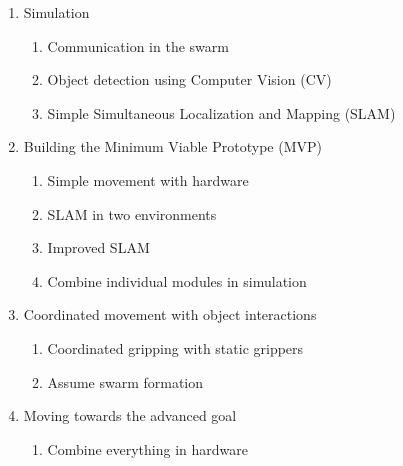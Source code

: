 \begin{enumerate}
    \item Simulation
    \begin{enumerate}[label=1.\arabic*]
        \item Communication in the swarm
        \item Object detection using Computer Vision (CV)
        \item Simple Simultaneous Localization and Mapping (SLAM)
    \end{enumerate}
    \item Building the Minimum Viable Prototype (MVP)
    \begin{enumerate}[label=2.\arabic*]
        \item Simple movement with hardware
        \item SLAM in two environments
        \item Improved SLAM
        \item Combine individual modules in simulation
    \end{enumerate}
    \item Coordinated movement with object interactions
    \begin{enumerate}[label=3.\arabic*]
        \item Coordinated gripping with static grippers
        \item Assume swarm formation
    \end{enumerate}
    \item Moving towards the advanced goal
    \begin{enumerate}[label=4.\arabic*]
        \item Combine everything in hardware
    \end{enumerate}
\end{enumerate}
